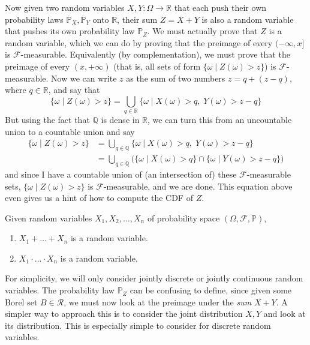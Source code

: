 \documentclass{article}
\begin{document}
      Now given two random variables $X, Y: \Omega \rightarrow \mathbb{R}$ that each push their own probability laws $\mathbb{P}_X, \mathbb{P}_Y$ onto $\mathbb{R}$, their sum $Z = X + Y$ is also a random variable that pushes its own probability law $\mathbb{P}_Z$. We must actually prove that $Z$ is a random variable, which we can do by proving that the preimage of every $(-\infty, x]$ is $\mathcal{F}$-measurable. Equivalently (by complementation), we must prove that the preimage of every $(x, +\infty)$ (that is, all sets of form $\{ \omega \mid Z(\omega) > z\}$) is $\mathcal{F}$-measurable. Now we can write $z$ as the sum of two numbers $z = q + (z - q)$, where $q \in \mathbb{R}$, and say that 
      \begin{equation}
        \{ \omega \mid Z(\omega) > z\} = \bigcup_{q \in \mathbb{R}} \{ \omega \mid X (\omega) > q , \; Y(\omega) > z - q\}
      \end{equation}
      But using the fact that $\mathbb{Q}$ is dense in $\mathbb{R}$, we can turn this from an uncountable union to a countable union and say 
      \begin{align}
        \{ \omega \mid Z(\omega) > z\} & = \bigcup_{q \in \mathbb{Q}} \{ \omega \mid X (\omega) > q , \; Y(\omega) > z - q\} \\
        & = \bigcup_{q \in \mathbb{Q}} \big( \{\omega \mid X(\omega) > q\} \cap \{ \omega \mid Y(\omega) > z - q\} \big) 
      \end{align}
      and since I have a countable union of (an intersection of) these $\mathcal{F}$-measurable sets, $\{ \omega \mid Z(\omega) > z\}$ is $\mathcal{F}$-measurable, and we are done. This equation above even gives us a hint of how to compute the CDF of $Z$. 

      \begin{theorem}
        Given random variables $X_1, X_2, \ldots, X_n$ of probability space $(\Omega, \mathcal{F}, \mathbb{P})$, 
        \begin{enumerate}
          \item $X_1 + \ldots + X_n$ is a random variable.
          \item $X_1 \cdot \ldots \cdot X_n$ is a random variable. 
        \end{enumerate}
      \end{theorem}

      For simplicity, we will only consider jointly discrete or jointly continuous random variables. The probability law $\mathbb{P}_Z$ can be confusing to define, since given some Borel set $B \in \mathcal{R}$, we must now look at the preimage under the \textit{sum} $X + Y$. A simpler way to approach this is to consider the joint distribution $X, Y$ and look at its distribution. This is especially simple to consider for discrete random variables. 
\end{document}
